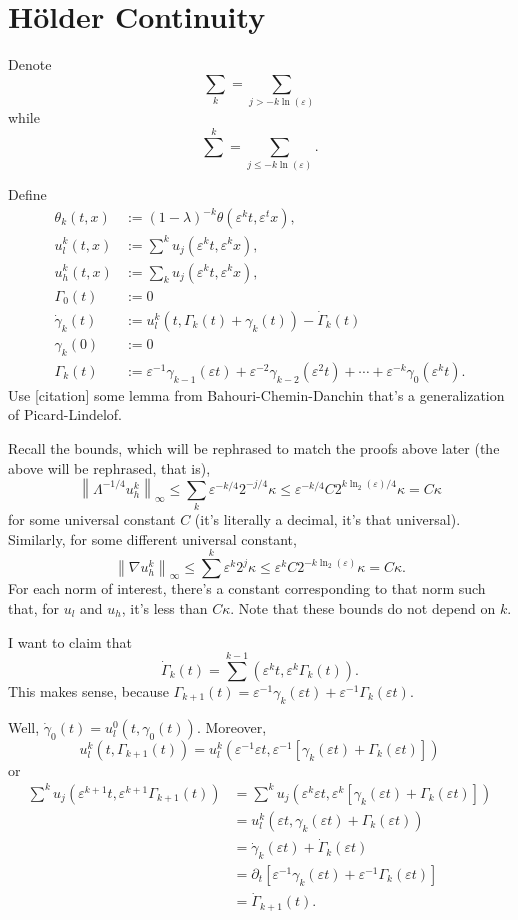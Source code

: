 \documentclass[11pt]{amsart}
\theoremstyle{remark}
\theoremstyle{definition}
\newcommand{\eps}{\varepsilon}
\newcommand{\norm}[1]{\left\lVert#1\right\rVert}
\newcommand{\bracket}[1]{\left[ #1 \right]}
\newcommand{\del}{\partial}
\newcommand{\grad}{\nabla}
\newcommand{\n}{^{-1}}
\newcommand{\ulow}{u_l}
\newcommand{\uhigh}{u_h}
\newcommand{\ulowth}[1]{\ulow^{#1}}
\newcommand{\uhighth}[1]{\uhigh^{#1}}
\begin{document}

\section{H\"{o}lder Continuity}

Denote
\[ \sum_k = \sum_{j > - k \ln(\eps)} \]
while
\[ \sum^k = \sum_{j \leq -k \ln(\eps)}. \]

Define
\begin{align*} 
\theta_k(t,x) &:= (1-\lambda)^{-k} \theta(\eps^k t, \eps^t x), \\
\ulowth{k}(t,x) &:= \sum^k u_j(\eps^k t, \eps^k x), \\
\uhighth{k}(t,x) &:= \sum_k u_j(\eps^k t, \eps^k x), \\
\Gamma_0(t) &:= 0 \\
\dot{\gamma}_k(t) &:= \ulowth{k}(t, \Gamma_k(t) + \gamma_k(t)) - \dot{\Gamma}_k(t) \\
\gamma_k(0) &:= 0 \\
\Gamma_k(t) &:= \eps\n \gamma_{k-1}(\eps t) + \eps^{-2} \gamma_{k-2}(\eps^2 t) + \cdots + \eps^{-k} \gamma_0(\eps^k t). 
\end{align*}
Use [citation] some lemma from Bahouri-Chemin-Danchin that's a generalization of Picard-Lindelof.  

Recall the bounds, which will be rephrased to match the proofs above later (the above will be rephrased, that is),
\[ \norm{\Lambda^{-1/4} \uhighth{k} }_\infty \leq \sum_k \eps^{-k/4} 2^{-j/4} \kappa \leq \eps^{-k/4} C 2^{k \ln_2(\eps) /4} \kappa = C \kappa \]
for some universal constant $C$ (it's literally a decimal, it's that universal).  Similarly, for some different universal constant,
\[ \norm{\grad \uhighth{k} }_\infty \leq \sum^k \eps^{k} 2^{j} \kappa \leq \eps^{k} C 2^{-k \ln_2(\eps)} \kappa = C \kappa. \]
For each norm of interest, there's a constant corresponding to that norm such that, for $\ulow$ and $\uhigh$, it's less than $C \kappa$.  Note that these bounds do not depend on $k$.  

I want to claim that 
\[ \dot{\Gamma}_k(t) = \sum^{k-1} (\eps^k t, \eps^k \Gamma_k(t)). \]
This makes sense, because $\Gamma_{k+1}(t) = \eps\n \gamma_k(\eps t) + \eps\n \Gamma_k(\eps t)$.  

Well, $\dot{\gamma}_0(t) = \ulowth{0}(t,\gamma_0(t))$.  Moreover, 
\[ \ulowth{k}(t,\Gamma_{k+1}(t)) = \ulowth{k}(\eps\n \eps t, \eps\n \bracket{\gamma_k(\eps t) + \Gamma_k(\eps t)}) \]
or
\begin{align*} 
\sum^k u_j(\eps^{k+1} t, \eps^{k+1} \Gamma_{k+1}(t)) &= \sum^k u_j(\eps^k \eps t, \eps^k \bracket{\gamma_k(\eps t) + \Gamma_k(\eps t)})
\\ &= \ulowth{k}(\eps t, \gamma_k(\eps t) + \Gamma_k(\eps t))
\\ &= \dot{\gamma}_k(\eps t) + \dot{\Gamma}_k(\eps t)
\\ &= \del_t \bracket{\eps\n \gamma_k(\eps t) + \eps\n \Gamma_k(\eps t)}
\\ &= \dot{\Gamma}_{k+1}(t).
\end{align*}
\end{document}

